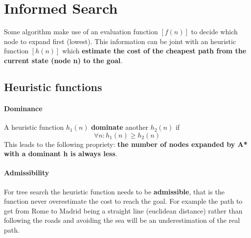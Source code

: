 \documentclass[10pt,a4paper]{article}
\begin{document}
\newpage

\section{Informed Search}

Some algorithm make use of an evaluation function $[f(n)]$ to decide which node to expand first (lowest). This information can be joint with an heuristic function $[h(n)]$ which \textbf{estimate the cost of the cheapest path from the current state (node n) to the goal}.

\subsection{Heuristic functions}


\paragraph{Dominance}
A heuristic function $h_1(n)$ \textbf{dominate} another $h_2(n)$ if 
\[\forall n : h_1(n) \ge h_2(n)\]
This leads to the following propriety: \textbf{the number of nodes expanded by A* with a dominant h is always less}.

\paragraph{Admissibility}
For tree search the heuristic function needs to be \textbf{admissible}, that is the function never overestimate the cost to reach the goal. For example the path to get from Rome to Madrid being a straight line (euclidean distance) rather than following the roads and avoiding the sea will be an underestimation of the real path.
\end{document}

